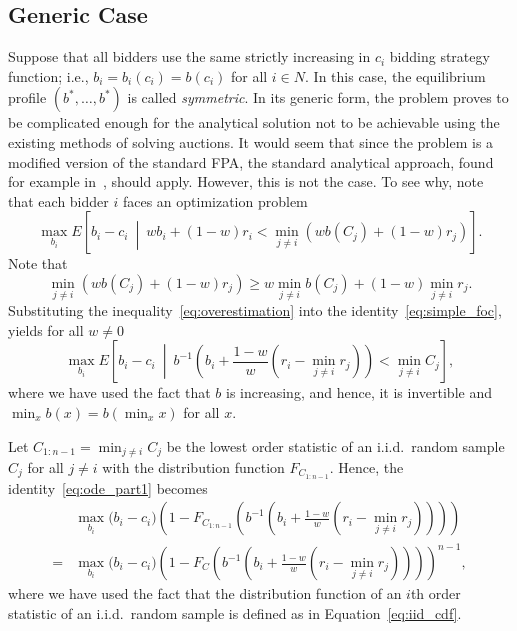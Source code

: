 \subsection{Generic Case} %
\label{sub:direct_generic_case}
Suppose that all bidders use the same strictly increasing in $c_i$ bidding strategy function; i.e., $b_i = b_i(c_i) = b(c_i)$ for all $i\in N$. In this case, the equilibrium profile $(b^*,\ldots,b^*)$ is called \emph{symmetric}. In its generic form, the problem proves to be complicated enough for the analytical solution not to be achievable using the existing methods of solving auctions. It would seem that since the problem is a modified version of the standard FPA, the standard analytical approach, found for example in~\cite{Krishna10,McAfee1987,Hansen88,Dastidar08}, should apply. However, this is not the case. To see why, note that each bidder $i$ faces an optimization problem
\begin{equation}
	\label{eq:simple_foc}
	\max_{b_i}E\left[ b_i-c_i \:\middle\vert\: wb_i + (1-w)r_i < \displaystyle\min_{j\neq i}(wb(C_j) + (1-w)r_j) \right].
\end{equation}
Note that
\begin{equation}
	\label{eq:overestimation}
	\displaystyle\min_{j\neq i}(wb(C_j) + (1-w)r_j) \ge w\displaystyle\min_{j\neq i}b(C_j) + (1-w)\displaystyle\min_{j\neq i}r_j.
\end{equation}
Substituting the inequality~\eqref{eq:overestimation} into the identity~\eqref{eq:simple_foc}, yields for all $w\neq 0$
\begin{equation}
	\max_{b_i}E\left[ b_i-c_i \:\middle\vert\: b^{-1}\left(b_i + \frac{1-w}{w}(r_i-\displaystyle\min_{j\neq i}r_j)\right) < \displaystyle\min_{j\neq i}C_j \right],
	\label{eq:ode_part1}
\end{equation}
where we have used the fact that $b$ is increasing, and hence, it is invertible and $\min_{x}b(x) = b(\min_{x}x)$ for all $x$.

Let $C_{1:n-1} = \min_{j\neq i}C_j$ be the lowest order statistic of an i.i.d.~random sample $C_j$ for all $j\neq i$ with the distribution function $F_{C_{1:n-1}}$. Hence, the identity~\eqref{eq:ode_part1} becomes
\begin{align}
	&\max_{b_i}\bigg(b_i-c_i\bigg)\left(1 - F_{C_{1:n-1}}\left(b^{-1}\left(b_i + \frac{1-w}{w}(r_i-\min_{j\neq i}r_j)\right)\right)\right) \nonumber\\
	= &\max_{b_i}\bigg(b_i-c_i\bigg)\left(1 - F_{C}\left(b^{-1}\left(b_i + \frac{1-w}{w}(r_i-\min_{j\neq i}r_j)\right)\right)\right)^{n-1},
	\label{eq:ode_part2}
\end{align}
where we have used the fact that the distribution function of an $i$th order statistic of an i.i.d.~random sample is defined as in Equation~\eqref{eq:iid_cdf}.

